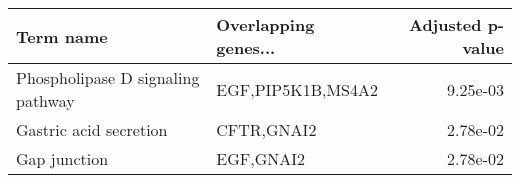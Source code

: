 \begin{tabular}{llr}
\toprule
                        Term name & Overlapping genes... &  Adjusted p-value \\
\midrule
Phospholipase D signaling pathway &    EGF,PIP5K1B,MS4A2 &          9.25e-03 \\
           Gastric acid secretion &           CFTR,GNAI2 &          2.78e-02 \\
                     Gap junction &            EGF,GNAI2 &          2.78e-02 \\
\bottomrule
\end{tabular}

